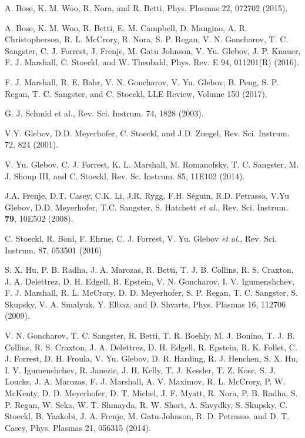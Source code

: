 \documentclass[aip,reprint]{revtex4-1}
\begin{document}
\begin{thebibliography}{5}
A. Bose, K. M. Woo, R. Nora, and R. Betti, Phys. Plasmas 22, 072702 (2015).

A. Bose, K. M. Woo, R. Betti, E. M. Campbell, D. Mangino, A. R. Christopherson, R. L. McCrory, R. Nora, S. P. Regan, V. N. Goncharov, T. C. Sangster, C. J. Forrest, J. Frenje, M. Gatu Johnson, V. Yu. Glebov, J. P. Knauer, F. J. Marshall, C. Stoeckl, and W. Theobald, Phys. Rev. E 94, 011201(R) (2016).

F. J. Marshall, R. E. Bahr, V. N. Goncharov, V. Yu. Glebov, B. Peng, S. P. Regan, T. C. Sangster, and C. Stoeckl, LLE Review, Volume 150 (2017).

G. J. Schmid et al., Rev. Sci. Instrum. 74, 1828 (2003).

V.Y. Glebov, D.D. Meyerhofer, C. Stoeckl, and J.D. Zuegel, Rev. Sci. Instrum. 72, 824 (2001).

V. Yu. Glebov, C. J. Forrest, K. L. Marshall, M. Romanofsky, T. C. Sangster, M. J. Shoup III, and C. Stoeckl, Rev. Sc. Instrum. 85, 11E102 (2014).

J.A. Frenje, D.T. Casey, C.K. Li, J.R. Rygg, F.H. Séguin, R.D. Petrasso, V.Yu Glebov, D.D. Meyerhofer, T.C. Sangster, S. Hatchett \textit{et al.}, Rev. Sci. Instrum. \textbf{79}, 10E502 (2008).

C. Stoeckl, R. Boni, F. Ehrne, C. J. Forrest, V. Yu. Glebov \textit{et al.}, Rev. Sci. Instrum. 87, 053501 (2016)


S. X. Hu, P. B. Radha, J. A. Marozas, R. Betti, T. J. B. Collins, R. S. Craxton, J. A. Delettrez, D. H. Edgell, R. Epstein, V. N. Goncharov, I. V. Igumenshchev, F. J. Marshall, R. L. McCrory, D. D. Meyerhofer, S. P. Regan, T. C. Sangster, S. Skupsky, V. A. Smalyuk, Y. Elbaz, and D. Shvarts, Phys. Plasmas 16, 112706 (2009).


V. N. Goncharov, T. C. Sangster, R. Betti, T. R. Boehly, M. J. Bonino, T. J. B. Collins, R. S. Craxton, J. A. Delettrez, D. H. Edgell, R. Epstein, R. K. Follet, C. J. Forrest, D. H. Froula, V. Yu. Glebov, D. R. Harding, R. J. Henchen, S. X. Hu, I. V. Igumenshchev, R. Janezic, J. H. Kelly, T. J. Kessler, T. Z. Kosc, S. J. Loucks, J. A. Marozas, F. J. Marshall, A. V. Maximov, R. L. McCrory, P. W. McKenty, D. D. Meyerhofer, D. T. Michel, J. F. Myatt, R. Nora, P. B. Radha, S. P. Regan, W. Seka, W. T. Shmayda, R. W. Short, A. Shvydky, S. Skupsky, C. Stoeckl, B. Yaakobi, J. A. Frenje, M. Gatu-Johnson, R. D. Petrasso, and D. T. Casey, Phys. Plasmas 21, 056315 (2014).


\end{thebibliography}
\end{document}
